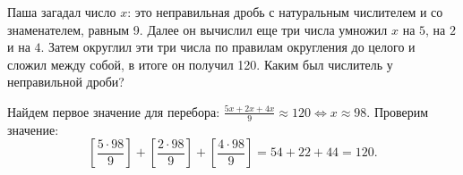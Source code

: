 
Паша загадал число $x$: это неправильная дробь с натуральным числителем и со знаменателем, равным 9. Далее он вычислил еще три числа умножил $x$ на $5$, на $2$ и на $4$. Затем округлил эти три числа по правилам округления до целого и сложил между собой, в итоге он получил 120. Каким был числитель у неправильной дроби?

\solutionSection

Найдем первое значение для перебора: $\frac{5x+2x+4x}{9}\approx120 \Leftrightarrow x \approx 98$. Проверим значение: $$\left[\frac{5\cdot98}{9}\right] + \left[\frac{2\cdot98}{9}\right] + \left[\frac{4\cdot98}{9}\right] = 54 + 22 + 44 = 120.$$

